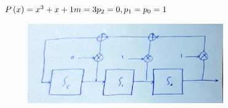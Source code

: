 \documentclass{article}
\begin{document}
\subsubsection{}
\begin{latin}
$
P\left( x \right) = x ^ 3 + x + 1\\
m = 3\\
p_2 = 0,  p_1 = p_0 = 1
$
\end{latin}
\begin{figure}[H]
    \centering
    \includegraphics[width=0.75\textwidth]{figures/2.jpg}
    \caption
	{}
    \label{fig:fig1}
\end{figure}


\section{}%
\subsection{}
\end{document}
